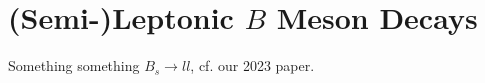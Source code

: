 \chapter{(Semi-)Leptonic \(B \) Meson Decays}
\label{ch:leptonic_B_decays}
Something something \(B_{s} \to ll \), cf. our 2023 paper.